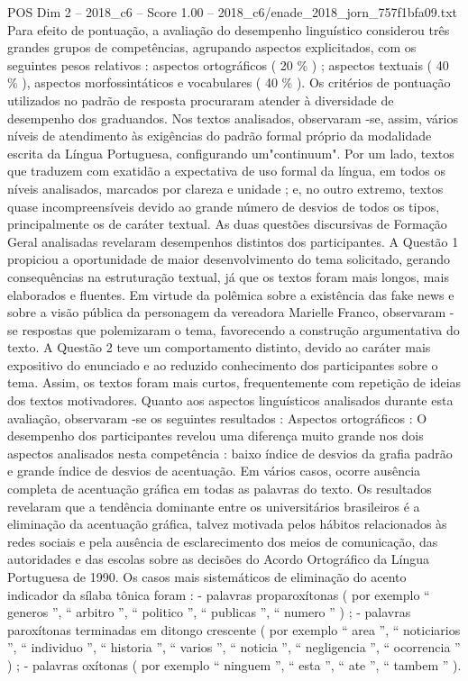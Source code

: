 \begin{textsample}{POS Dim 2 – 2018\_c6 – Score 1.00 – 2018\_c6/enade\_2018\_jorn\_757f1bfa09.txt}
Para efeito de pontuação, a avaliação do desempenho linguístico considerou três grandes grupos de competências, agrupando aspectos explicitados, com os seguintes pesos relativos : aspectos ortográficos ( 20 \% ) ; aspectos textuais ( 40 \% ), aspectos morfossintáticos e vocabulares ( 40 \% ).
Os critérios de pontuação utilizados no padrão de resposta procuraram atender à diversidade de desempenho dos graduandos.
Nos textos analisados, observaram -se, assim, vários níveis de atendimento às exigências do padrão formal próprio da modalidade escrita da Língua Portuguesa, configurando um"continuum".
Por um lado, textos que traduzem com exatidão a expectativa de uso formal da língua, em todos os níveis analisados, marcados por clareza e unidade ; e, no outro extremo, textos quase incompreensíveis devido ao grande número de desvios de todos os tipos, principalmente os de caráter textual.
As duas questões discursivas de Formação Geral analisadas revelaram desempenhos distintos dos participantes.
A Questão 1 propiciou a oportunidade de maior desenvolvimento do tema solicitado, gerando consequências na estruturação textual, já que os textos foram mais longos, mais elaborados e fluentes.
Em virtude da polêmica sobre a existência das fake news e sobre a visão pública da personagem da vereadora Marielle Franco, observaram -se respostas que polemizaram o tema, favorecendo a construção argumentativa do texto.
A Questão 2 teve um comportamento distinto, devido ao caráter mais expositivo do enunciado e ao reduzido conhecimento dos participantes sobre o tema.
Assim, os textos foram mais curtos, frequentemente com repetição de ideias dos textos motivadores.
Quanto aos aspectos linguísticos analisados durante esta avaliação, observaram -se os seguintes resultados : Aspectos ortográficos : O desempenho dos participantes revelou uma diferença muito grande nos dois aspectos analisados nesta competência : baixo índice de desvios da grafia padrão e grande índice de desvios de acentuação.
Em vários casos, ocorre ausência completa de acentuação gráfica em todas as palavras do texto.
Os resultados revelaram que a tendência dominante entre os universitários brasileiros é a eliminação da acentuação gráfica, talvez motivada pelos hábitos relacionados às redes sociais e pela ausência de esclarecimento dos meios de comunicação, das autoridades e das escolas sobre as decisões do Acordo Ortográfico da Língua Portuguesa de 1990.
Os casos mais sistemáticos de eliminação do acento indicador da sílaba tônica foram : - palavras proparoxítonas ( por exemplo “ generos ”, “ arbitro ”, “ politico ”, “ publicas ”, “ numero ” ) ; - palavras paroxítonas terminadas em ditongo crescente ( por exemplo “ area ”, “ noticiarios ”, “ individuo ”, “ historia ”, “ varios ”, “ noticia ”, “ negligencia ”, “ ocorrencia ” ) ; - palavras oxítonas ( por exemplo “ ninguem ”, “ esta ”, “ ate ”, “ tambem ” ).

\end{textsample}
